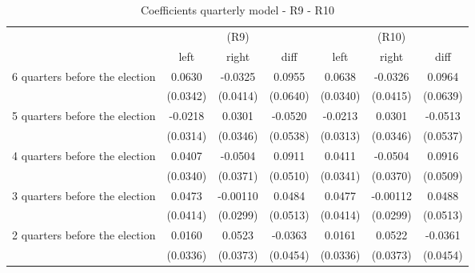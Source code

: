 \begin{table}[!ht]\centering \footnotesize
\def\sym#1{\ifmmode^{#1}\else\(^{#1}\)\fi}
\caption{Coefficients quarterly model - R9 - R10}
\begin{tabular}{l*{6}{c}}
\hline\hline
                    &\multicolumn{3}{c}{(R9)}&\multicolumn{3}{c}{(R10)}\\
&\multicolumn{1}{c}{left}&\multicolumn{1}{c}{right}&\multicolumn{1}{c}{diff}&\multicolumn{1}{c}{left}&\multicolumn{1}{c}{right}&\multicolumn{1}{c}{diff}\\

\hline
 6 quarters before the election&      0.0630         &     -0.0325         &      0.0955         &      0.0638         &     -0.0326         &      0.0964         \\
                    &    (0.0342)         &    (0.0414)         &    (0.0640)         &    (0.0340)         &    (0.0415)         &    (0.0639)         \\
[0.5em]
 5 quarters before the election&     -0.0218         &      0.0301         &     -0.0520         &     -0.0213         &      0.0301         &     -0.0513         \\
                    &    (0.0314)         &    (0.0346)         &    (0.0538)         &    (0.0313)         &    (0.0346)         &    (0.0537)         \\
[0.5em]
 4 quarters before the election&      0.0407         &     -0.0504         &      0.0911         &      0.0411         &     -0.0504         &      0.0916         \\
                    &    (0.0340)         &    (0.0371)         &    (0.0510)         &    (0.0341)         &    (0.0370)         &    (0.0509)         \\
[0.5em]
 3 quarters before the election&      0.0473         &    -0.00110         &      0.0484         &      0.0477         &    -0.00112         &      0.0488         \\
                    &    (0.0414)         &    (0.0299)         &    (0.0513)         &    (0.0414)         &    (0.0299)         &    (0.0513)         \\
[0.5em]
 2 quarters before the election&      0.0160         &      0.0523         &     -0.0363         &      0.0161         &      0.0522         &     -0.0361         \\
                    &    (0.0336)         &    (0.0373)         &    (0.0454)         &    (0.0336)         &    (0.0373)         &    (0.0454)         \\

\end{tabular}
\end{table}
